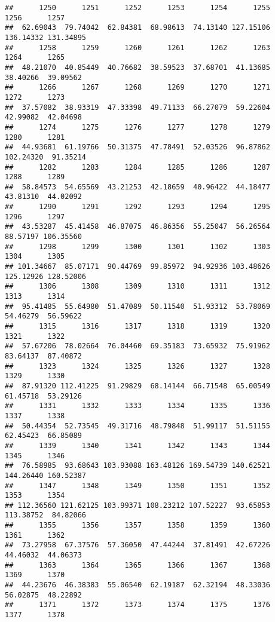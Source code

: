 \documentclass[
]{article}
\begin{document}
\begin{verbatim}
##      1250      1251      1252      1253      1254      1255      1256      1257 
##  62.69043  79.74042  62.84381  68.98613  74.13140 127.15106 136.14332 131.34895 
##      1258      1259      1260      1261      1262      1263      1264      1265 
##  48.21070  40.85449  40.76682  38.59523  37.68701  41.13685  38.40266  39.09562 
##      1266      1267      1268      1269      1270      1271      1272      1273 
##  37.57082  38.93319  47.33398  49.71133  66.27079  59.22604  42.99082  42.04698 
##      1274      1275      1276      1277      1278      1279      1280      1281 
##  44.93681  61.19766  50.31375  47.78491  52.03526  96.87862 102.24320  91.35214 
##      1282      1283      1284      1285      1286      1287      1288      1289 
##  58.84573  54.65569  43.21253  42.18659  40.96422  44.18477  43.81310  44.02092 
##      1290      1291      1292      1293      1294      1295      1296      1297 
##  43.53287  45.41458  46.87075  46.86356  55.25047  56.26564  88.57197 106.35560 
##      1298      1299      1300      1301      1302      1303      1304      1305 
## 101.34667  85.07171  90.44769  99.85972  94.92936 103.48626 125.12926 128.52006 
##      1306      1308      1309      1310      1311      1312      1313      1314 
##  95.41485  55.64980  51.47089  50.11540  51.93312  53.78069  54.46279  56.59622 
##      1315      1316      1317      1318      1319      1320      1321      1322 
##  57.67206  78.02664  76.04460  69.35183  73.65932  75.91962  83.64137  87.40872 
##      1323      1324      1325      1326      1327      1328      1329      1330 
##  87.91320 112.41225  91.29829  68.14144  66.71548  65.00549  61.45718  53.29126 
##      1331      1332      1333      1334      1335      1336      1337      1338 
##  50.44354  52.73545  49.31716  48.79848  51.99117  51.51155  62.45423  66.85089 
##      1339      1340      1341      1342      1343      1344      1345      1346 
##  76.58985  93.68643 103.93088 163.48126 169.54739 140.62521 144.26440 160.52387 
##      1347      1348      1349      1350      1351      1352      1353      1354 
## 112.36560 121.62125 103.99371 108.23212 107.52227  93.65853 113.38752  84.82066 
##      1355      1356      1357      1358      1359      1360      1361      1362 
##  73.27958  67.37576  57.36050  47.44244  37.81491  42.67226  44.46032  44.06373 
##      1363      1364      1365      1366      1367      1368      1369      1370 
##  44.23676  46.38383  55.06540  62.19187  62.32194  48.33036  56.02875  48.22892 
##      1371      1372      1373      1374      1375      1376      1377      1378 

\end{verbatim}
\end{document}

